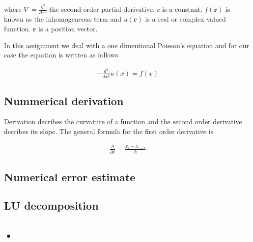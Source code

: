 \documentclass[11pt,twoside,a4paper,twocolumn]{article}
\newcommand{\nl}{

\medskip
\noindent
}
\begin{document}
where $\nabla = \frac{\partial^2}{\partial x^2}$ the second order partial derivative. $c$ is a constant, $f(\textbf{r})$ is known as the inhomogeneous term and $u(\textbf{r})$ is a real or complex valued function. $\textbf{r}$ is a position vector.
\nl
In this assignment we deal with a one dimentional Poisson's equation and for our case the equation is written as follows.

\begin{align*}
-\frac{d^2}{d x^2}u(x) = f(x)
\end{align*}

\subsection*{Nummerical derivation}

Derivation decribes the curvature of a function and the second order derivative decribes its slope. The general formula for the first order derivative is

\begin{align*}
\frac{\partial}{\partial x} = \frac{x_i - x_{i-1}}{h}
\end{align*}

\subsection*{Numerical error estimate}


\subsection*{LU decomposition}

\subsection*{•}

\newpage

\end{document}
